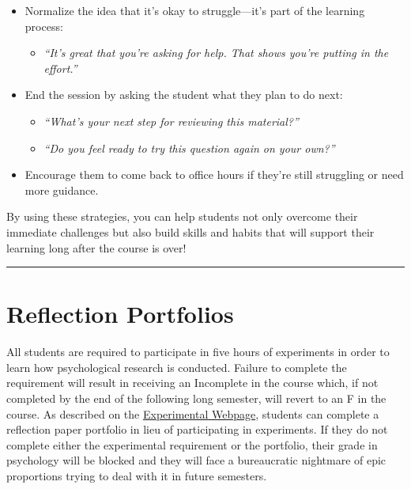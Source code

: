 \documentclass[
]{article}
\providecommand{\tightlist}{%
  \setlength{\itemsep}{0pt}\setlength{\parskip}{0pt}}
\begin{document}
\begin{itemize}
\tightlist
\item
  Normalize the idea that it's okay to struggle---it's part of the learning process:

  \begin{itemize}
  \tightlist
  \item
    \emph{``It's great that you're asking for help. That shows you're putting in the effort.''}
  \end{itemize}
\item
  End the session by asking the student what they plan to do next:

  \begin{itemize}
  \tightlist
  \item
    \emph{``What's your next step for reviewing this material?''}
  \item
    \emph{``Do you feel ready to try this question again on your own?''}
  \end{itemize}
\item
  Encourage them to come back to office hours if they're still struggling or need more guidance.
\end{itemize}

By using these strategies, you can help students not only overcome their immediate challenges but also build skills and habits that will support their learning long after the course is over!

\begin{center}\rule{0.5\linewidth}{0.5pt}\end{center}

\hypertarget{reflection-portfolios}{%
\section{Reflection Portfolios}\label{reflection-portfolios}}

All students are required to participate in five hours of experiments in order to learn how psychological research is conducted. Failure to complete the requirement will result in receiving an Incomplete in the course which, if not completed by the end of the following long semester, will revert to an F in the course. As described on the \href{https://liberalarts.utexas.edu/psychology/undergraduate-program/research-opportunities/psychology-301/}{Experimental Webpage}, students can complete a reflection paper portfolio in lieu of participating in experiments. If they do not complete either the experimental requirement or the portfolio, their grade in psychology will be blocked and they will face a bureaucratic nightmare of epic proportions trying to deal with it in future semesters.
\end{document}
